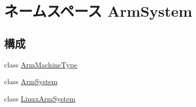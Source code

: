 \hypertarget{namespaceArmSystem}{
\section{ネームスペース ArmSystem}
\label{namespaceArmSystem}
}
\subsection*{構成}
\begin{DoxyCompactItemize}
\item 
class \hyperlink{classArmSystem_1_1ArmMachineType}{ArmMachineType}
\item 
class \hyperlink{classArmSystem_1_1ArmSystem}{ArmSystem}
\item 
class \hyperlink{classArmSystem_1_1LinuxArmSystem}{LinuxArmSystem}
\end{DoxyCompactItemize}
